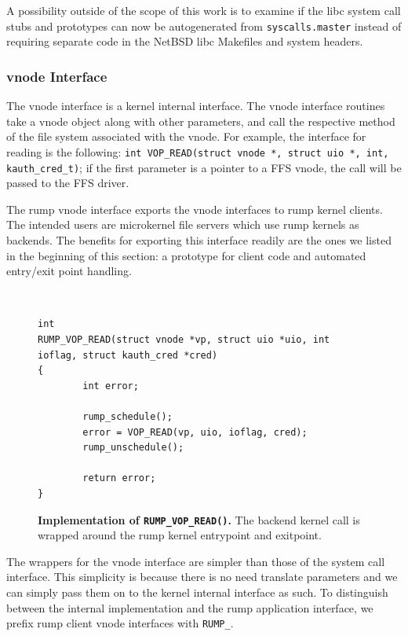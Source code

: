 A possibility outside of the scope of this work is to examine if
the libc system call stubs and prototypes can now be autogenerated
from \texttt{syscalls.master} instead of requiring separate code
in the NetBSD libc Makefiles and system headers.

\subsubsection{vnode Interface}

The vnode interface is a kernel internal interface.  The vnode
interface routines take a vnode object along with other parameters,
and call the respective method of the file system associated with
the vnode.  For example, the interface for reading is the following:
\verb+int VOP_READ(struct vnode *, struct uio *, int, kauth_cred_t)+;
if the first parameter is a pointer to a FFS vnode, the call will be
passed to the FFS driver.

The rump vnode interface exports the vnode interfaces
to rump kernel clients.  The intended users are microkernel file servers
which use rump kernels as backends.  The benefits for
exporting this interface readily are the ones we listed in the
beginning of this section: a prototype for client code and
automated entry/exit point handling.

\begin{figure}[t]
{\tt \scriptsize  
\begin{verbatim}
int
RUMP_VOP_READ(struct vnode *vp, struct uio *uio, int ioflag, struct kauth_cred *cred)
{
        int error;

        rump_schedule();
        error = VOP_READ(vp, uio, ioflag, cred);
        rump_unschedule();

        return error;
}
\end{verbatim}}
\caption[Implementation of \texttt{RUMP\_VOP\_READ()}]{
\textbf{Implementation of \texttt{RUMP\_VOP\_READ()}.}
The backend kernel call is wrapped around the rump kernel entrypoint
and exitpoint.
}
\label{fig:rumpvopread}
\end{figure}

The wrappers for the vnode interface are simpler than those of the
system call interface.  This simplicity is because there is no need translate
parameters and we can simply pass them on to the kernel internal
interface as such.  To distinguish between the internal implementation
and the rump application interface, we prefix rump client vnode
interfaces with \verb+RUMP_+.

